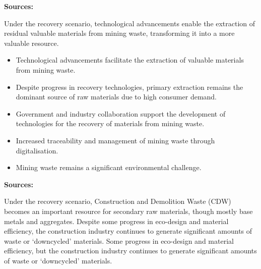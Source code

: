 \wasteSubsubsecMIN 
\textbf{Sources:} 

Under the recovery scenario, technological advancements enable the extraction of residual valuable materials from mining waste, transforming it into a more valuable resource.

\begin{itemize}
  \item Technological advancements facilitate the extraction of valuable materials from mining waste.
  \item Despite progress in recovery technologies, primary extraction remains the dominant source of raw materials due to high consumer demand.
  \item Government and industry collaboration support the development of technologies for the recovery of materials from mining waste.
  \item Increased traceability and management of mining waste through digitalisation.
  \item Mining waste remains a significant environmental challenge.
\end{itemize}

\wasteSubsubsecCDW 
\textbf{Sources:}~\cite{eu2008wastedirective}

Under the recovery scenario, Construction and Demolition Waste (CDW) becomes an important resource for secondary raw materials, though mostly base metals and aggregates. Despite some progress in eco-design and material efficiency, the construction industry continues to generate significant amounts of waste or `downcycled' materials. Some progress in eco-design and material efficiency, but the construction industry continues to generate significant amounts of waste or ‘downcycled’ materials.

